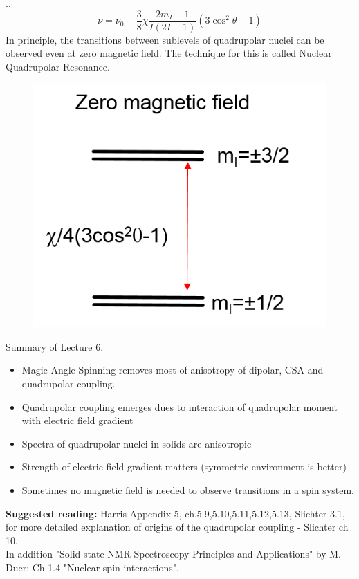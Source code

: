 \documentclass{beamer}
\begin{document}
\begin{frame}{\thesection.\thesubsection. \insertsubsection}
	\begin{equation}
	\nu = \nu_0 -\dfrac{3}{8} \chi \dfrac{2 m_I -1}{I(2I -1)}(3 \cos^2 \theta - 1)
	\end{equation}
	In principle, the transitions between sublevels of quadrupolar nuclei can be observed even at zero magnetic field. The technique for this is called \alert{Nuclear Quadrupolar Resonance}.
	\begin{figure}
		\centering
		\includegraphics[scale=0.5]{Quadrupole_ZF.png}
	\end{figure}
\end{frame}

\begin{frame}{Summary of Lecture 6.}
	\begin{itemize}[<+>]
		\item 	Magic Angle Spinning removes most of anisotropy of dipolar, CSA and quadrupolar coupling.
		\item Quadrupolar coupling emerges dues to interaction of quadrupolar moment with electric field gradient
		\item Spectra of quadrupolar nuclei in solids are anisotropic
		\item Strength of electric field gradient matters (symmetric environment is better)
		\item Sometimes no magnetic field is needed to observe transitions in a spin system.
	\end{itemize}
	
    \textbf{Suggested reading:}  Harris  Appendix 5, ch.5.9,5.10,5.11,5.12,5.13, Slichter 3.1, for more detailed explanation of origins of the quadrupolar coupling - Slichter ch 10.\\
    In addition "Solid-state NMR Spectroscopy Principles and Applications" by M. Duer: Ch 1.4 "Nuclear spin interactions".
    
\end{frame}
\end{document}
